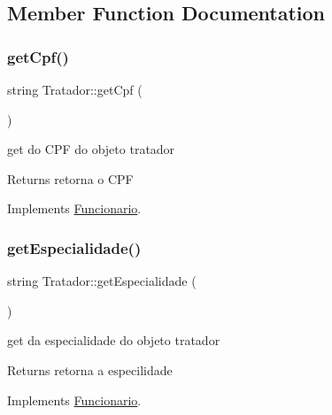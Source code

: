 \subsection{Member Function Documentation}
\mbox{\label{class_tratador_a46673ddeb1c34d0fba5c9e45d44438b6}} 
\subsubsection{\texorpdfstring{getCpf()}{getCpf()}}
{\footnotesize\ttfamily string Tratador\+::get\+Cpf (\begin{DoxyParamCaption}{ }\end{DoxyParamCaption})\hspace{0.3cm}{\ttfamily [virtual]}}



get do C\+PF do objeto tratador 

\begin{DoxyReturn}{Returns}
retorna o C\+PF 
\end{DoxyReturn}


Implements \mbox{\hyperlink{class_funcionario}{Funcionario}}.

\mbox{\label{class_tratador_a41a7697865fc0a821f06102b86f160b7}} 
\subsubsection{\texorpdfstring{getEspecialidade()}{getEspecialidade()}}
{\footnotesize\ttfamily string Tratador\+::get\+Especialidade (\begin{DoxyParamCaption}{ }\end{DoxyParamCaption})\hspace{0.3cm}{\ttfamily [virtual]}}



get da especialidade do objeto tratador 

\begin{DoxyReturn}{Returns}
retorna a especilidade 
\end{DoxyReturn}


Implements \mbox{\hyperlink{class_funcionario}{Funcionario}}.

\mbox{\label{class_tratador_a3f35d05a4ebaa992c473e88cda95e47a}} 
